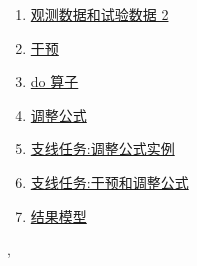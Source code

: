 \documentclass[11pt]{article}
\renewcommand{\today}{\shortmonthname[\the\month] \the \day,  \the\year}
\begin{document}
\begin{multicols}{3}
\begin{enumerate}
		\item \href{https://mp.weixin.qq.com/s/o-CXebk_5XEgsNOFgPFELQ}{\small 观测数据和试验数据 2}	%
		\item \href{https://mp.weixin.qq.com/s/vwlbqxVd0VccyC8d9560VA}{\small 干预}	%
		\item \href{https://mp.weixin.qq.com/s/yRsmm3m4-Gml4omoORn52Q}{\small do 算子}	%
		\item \href{https://mp.weixin.qq.com/s/-qLTS8iGjqj6IKS3S5GxWg}{\small 调整公式}	%
		\item \href{https://mp.weixin.qq.com/s/SFulXDLBui7nJSZJemwYkg}{\small 支线任务:调整公式实例}	%
		\item \href{https://mp.weixin.qq.com/s/u2cRH1uGTJoPweWrLHuEdA}{\small 支线任务:干预和调整公式}	%
		\item \href{https://mp.weixin.qq.com/s/nYpB7nC794hEPtlY8eY9WQ}{\small 结果模型}	%
	\end{enumerate}
\end{multicols}




%
\begin{flushright}
	\tiny \today 
\end{flushright}
\end{document}
